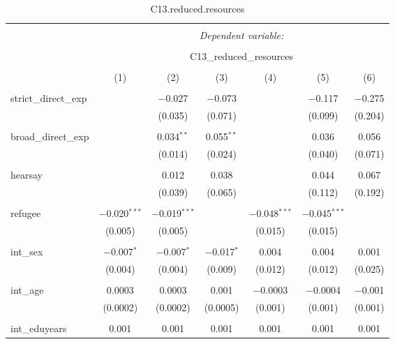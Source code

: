 
\begin{table}[H] \centering 
  \caption{C13.reduced.resources} 
  \label{} 
\tiny 
\begin{tabular}{@{\extracolsep{4pt}}lcccccc} 
\\[-1.8ex]\hline 
\hline \\[-1.8ex] 
 & \multicolumn{6}{c}{\textit{Dependent variable:}} \\ 
\cline{2-7} 
\\[-1.8ex] & \multicolumn{6}{c}{C13\_reduced\_resources} \\ 
\\[-1.8ex] & (1) & (2) & (3) & (4) & (5) & (6)\\ 
\hline \\[-1.8ex] 
 strict\_direct\_exp &  & $-$0.027 & $-$0.073 &  & $-$0.117 & $-$0.275 \\ 
  &  & (0.035) & (0.071) &  & (0.099) & (0.204) \\ 
  & & & & & & \\ 
 broad\_direct\_exp &  & 0.034$^{**}$ & 0.055$^{**}$ &  & 0.036 & 0.056 \\ 
  &  & (0.014) & (0.024) &  & (0.040) & (0.071) \\ 
  & & & & & & \\ 
 hearsay &  & 0.012 & 0.038 &  & 0.044 & 0.067 \\ 
  &  & (0.039) & (0.065) &  & (0.112) & (0.192) \\ 
  & & & & & & \\ 
 refugee & $-$0.020$^{***}$ & $-$0.019$^{***}$ &  & $-$0.048$^{***}$ & $-$0.045$^{***}$ &  \\ 
  & (0.005) & (0.005) &  & (0.015) & (0.015) &  \\ 
  & & & & & & \\ 
 int\_sex & $-$0.007$^{*}$ & $-$0.007$^{*}$ & $-$0.017$^{*}$ & 0.004 & 0.004 & 0.001 \\ 
  & (0.004) & (0.004) & (0.009) & (0.012) & (0.012) & (0.025) \\ 
  & & & & & & \\ 
 int\_age & 0.0003 & 0.0003 & 0.001 & $-$0.0003 & $-$0.0004 & $-$0.001 \\ 
  & (0.0002) & (0.0002) & (0.0005) & (0.001) & (0.001) & (0.001) \\ 
  & & & & & & \\ 
 int\_eduyears & 0.001 & 0.001 & 0.001 & 0.001 & 0.001 & 0.001 \\ 

\end{tabular}
\end{table}
